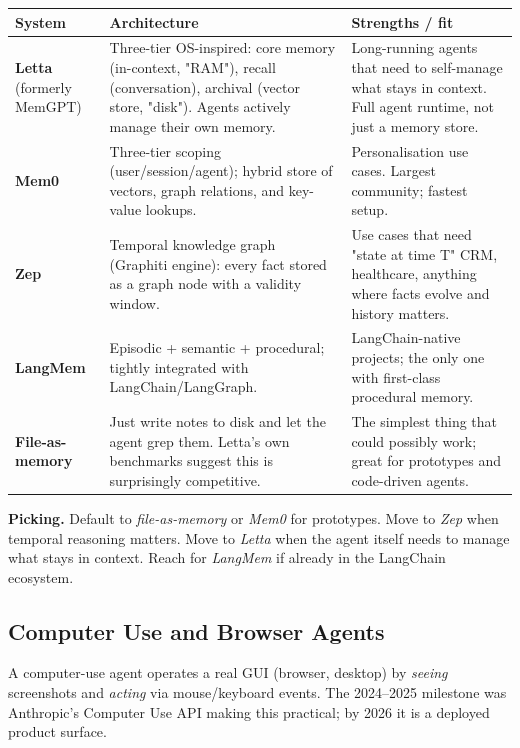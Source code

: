 \documentclass[a4paper,11pt]{article}
\begin{document}
\begin{center}\small
\begin{tabular}{p{2.6cm} p{4.5cm} p{5.4cm}}
  \toprule
  \textbf{System} & \textbf{Architecture} & \textbf{Strengths / fit} \\
  \midrule
  \textbf{Letta} (formerly MemGPT) &
    Three-tier OS-inspired: core memory (in-context, "RAM"), recall (conversation), archival (vector store, "disk"). Agents actively manage their own memory. &
    Long-running agents that need to self-manage what stays in context. Full agent runtime, not just a memory store. \\
  \addlinespace
  \textbf{Mem0} &
    Three-tier scoping (user/session/agent); hybrid store of vectors, graph relations, and key-value lookups. &
    Personalisation use cases. Largest community; fastest setup. \\
  \addlinespace
  \textbf{Zep} &
    Temporal knowledge graph (Graphiti engine): every fact stored as a graph node with a validity window. &
    Use cases that need "state at time T" \textemdash{} CRM,
    healthcare, anything where facts evolve and history matters. \\
  \addlinespace
  \textbf{LangMem} &
    Episodic + semantic + procedural; tightly integrated with LangChain/LangGraph. &
    LangChain-native projects; the only one with first-class
    procedural memory. \\
  \addlinespace
  \textbf{File-as-memory} &
    Just write notes to disk and let the agent grep them. Letta's own
    benchmarks suggest this is surprisingly competitive. &
    The simplest thing that could possibly work; great for prototypes
    and code-driven agents. \\
  \bottomrule
\end{tabular}
\end{center}

\textbf{Picking.} Default to \textit{file-as-memory} or
\textit{Mem0} for prototypes. Move to \textit{Zep} when temporal
reasoning matters. Move to \textit{Letta} when the agent itself
needs to manage what stays in context. Reach for \textit{LangMem} if
already in the LangChain ecosystem.

\subsection{Computer Use and Browser Agents}

A computer-use agent operates a real GUI (browser, desktop) by
\emph{seeing} screenshots and \emph{acting} via mouse/keyboard
events. The 2024–2025 milestone was Anthropic's Computer Use API
making this practical; by 2026 it is a deployed product surface.
\end{document}
